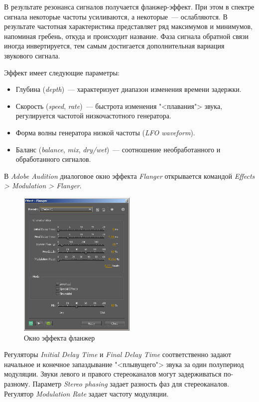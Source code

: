 \documentclass[oneside, final, 14pt]{extreport}
\begin{document}
В результате резонанса сигналов получается фланжер-эффект. При этом в спектре сигнала некоторые частоты усиливаются, а некоторые~--- ослабляются. В результате частотная характеристика представляет ряд максимумов и минимумов, напоминая гребень, откуда и происходит название. Фаза сигнала обратной связи иногда инвертируется, тем самым достигается дополнительная вариация звукового сигнала.

Эффект имеет следующие параметры:
\begin{itemize}
  \item Глубина (\textit{depth})~--- характеризует диапазон изменения времени задержки.
  \item Скорость (\textit{speed}, \textit{rate})~--- быстрота изменения "<плавания"> звука, регулируется частотой низкочастотного генератора.
  \item Форма волны генератора низкой частоты (\textit{LFO waveform}).
  \item Баланс (\textit{balance}, \textit{mix}, \textit{dry/wet})~--- соотношение необработанного и обработанного сигналов.
\end{itemize}

В \emph{Adobe Audition} диалоговое окно эффекта \textit{Flanger} открывается командой \textit{Effects > Modulation > Flanger}.

\begin{figure}[h!]
  \centering
  \includegraphics[width=0.5\textwidth]{pic-auflanger-01}
  \caption{Окно эффекта фланжер}
  \label{pic-auflanger-01}
\end{figure}

Регуляторы \textit{Initial Delay Time} и \textit{Final Delay Time} соответственно задают начальное и конечное запаздывание "<плывущего"> звука за один полупериод модуляции. Звуки левого и правого стереоканалов могут задерживаться по-разному. Параметр \textit{Stereo phasing} задает разность фаз для стереоканалов. Регулятор \textit{Modulation Rate} задает частоту модуляции.
\end{document}
